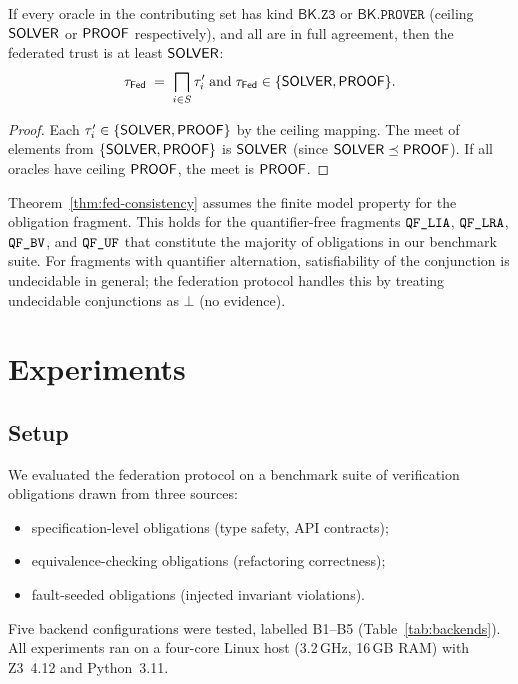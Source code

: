 \documentclass[11pt]{article}
\newcommand{\Fed}{\mathsf{Fed}}             %
\newcommand{\BK}{\mathsf{BK}}               %
\begin{document}
\begin{corollary}\label{cor:all-solver}
  If every oracle in the contributing set has kind $\BK.\texttt{Z3}$ or
  $\BK.\texttt{PROVER}$ (ceiling $\mathsf{SOLVER}$ or $\mathsf{PROOF}$ respectively),
  and all are in full agreement, then the federated trust is at least
  $\mathsf{SOLVER}$:
  \[
    \tau_{\Fed} \;=\; \bigsqcap_{i \in S} \tau_i'
    \;\text{and}\; \tau_{\Fed} \in \{\Tsolver, \Tproof\}.
  \]
\end{corollary}
\begin{proof}
  Each $\tau_i' \in \{\mathsf{SOLVER}, \mathsf{PROOF}\}$ by the ceiling mapping.
  The meet of elements from $\{\mathsf{SOLVER}, \mathsf{PROOF}\}$ is $\mathsf{SOLVER}$
  (since $\mathsf{SOLVER} \preceq \mathsf{PROOF}$).  If all oracles have ceiling
  $\mathsf{PROOF}$, the meet is $\mathsf{PROOF}$.
\end{proof}

\begin{remark}
  Theorem~\ref{thm:fed-consistency} assumes the finite model property
  for the obligation fragment.  This holds for the quantifier-free
  fragments $\texttt{QF\_LIA}$, $\texttt{QF\_LRA}$, $\texttt{QF\_BV}$, and $\texttt{QF\_UF}$ that constitute
  the majority of obligations in our benchmark suite.  For fragments
  with quantifier alternation, satisfiability of the conjunction is
  undecidable in general; the federation protocol handles this by
  treating undecidable conjunctions as $\bot$ (no evidence).
\end{remark}

\section{Experiments}\label{sec:experiments}

\subsection{Setup}

We evaluated the federation protocol on a benchmark suite of
\numcases{} verification obligations drawn from three sources:
\begin{itemize}[nosep]
  \item \numspec{} specification-level obligations (type safety, API
        contracts);
  \item \numeq{} equivalence-checking obligations (refactoring
        correctness);
  \item \numbug{} fault-seeded obligations (injected invariant
        violations).
\end{itemize}
Five backend configurations were tested, labelled B1--B5
(Table~\ref{tab:backends}).  All experiments ran on a four-core Linux
host (3.2\,GHz, 16\,GB RAM) with Z3~4.12 and Python~3.11.
\end{document}
